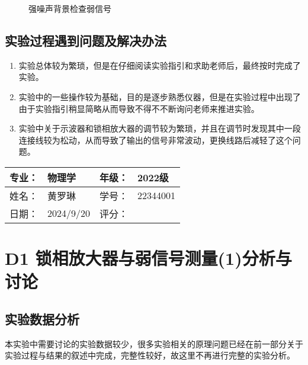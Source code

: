 \documentclass[dvipsnames, svgnames,a4paper,11pt]{article}
\begin{document}
	\begin{figure}[htbp]
		\centering
		\quad
		\quad
		\caption{强噪声背景检查弱信号}
		\label{强噪声背景检查弱信号}
		\end{figure}



	
	\subsection{实验过程遇到问题及解决办法}
	\begin{enumerate}
		\item 实验总体较为繁琐，但是在仔细阅读实验指引和求助老师后，最终按时完成了实验。
		\item 实验中的一些操作较为基础，目的是逐步熟悉仪器，但是在实验过程中出现了由于实验指引稍显简略从而导致不得不不断询问老师来推进实验。
		\item 实验中关于示波器和锁相放大器的调节较为繁琐，并且在调节时发现其中一段连接线较为松动，从而导致了输出的信号非常波动，更换线路后减轻了这个问题。
	\end{enumerate}
	
	
	
	\clearpage
	
	\begin{table}
		\renewcommand\arraystretch{1.7}
		\begin{tabularx}{\textwidth}{|X|X|X|X|}
			\hline
			专业：& 物理学 &年级：& 2022级\\
			\hline
			姓名： & 黄罗琳 & 学号：& 22344001\\
			\hline
			日期：& 2024/9/20& 评分： &\\
			\hline
		\end{tabularx}
	\end{table}
	
	\section{D1 锁相放大器与弱信号测量(1)\quad\heiti 分析与讨论}
	
	\subsection{实验数据分析}
	本实验中需要讨论的实验数据较少，很多实验相关的原理问题已经在前一部分关于实验过程与结果的叙述中完成，完整性较好，故这里不再进行完整的实验分析。
\end{document}
